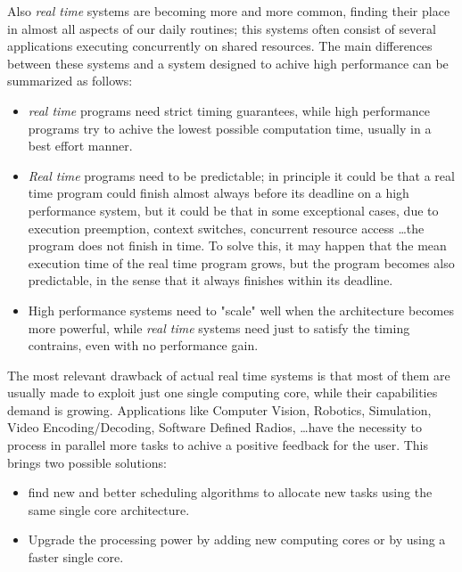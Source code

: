 \documentclass[a4paper,11pt,oneside]{book}
\begin{document}
Also \emph{real time} systems are becoming more and more common, finding their place in almost all aspects of our daily routines; this systems often consist of several applications executing concurrently on shared resources. 
The main differences between these systems and a system designed to achive high performance can be summarized as follows:
\begin{itemize}
\item{ \emph{real time} programs need strict timing guarantees, while high performance programs try to achive the lowest possible computation time, usually in a best effort manner.}
\item{\emph{Real time} programs need to be predictable; in principle it could be that a real time program could finish almost always before its deadline on a high performance system, but it could be that in some exceptional cases, due to execution preemption, context switches, concurrent resource access \dots the program does not finish in time. To solve this, it may happen that the mean execution time of the real time program grows, but the program becomes also predictable, in the sense that it always finishes within its deadline.}
\item{ High performance systems need to "scale" well when the architecture becomes more powerful, while \emph{real time} systems need just to satisfy the timing contrains, even with no performance gain.}

\end{itemize}

The most relevant drawback of actual real time systems is that most of them are usually made to exploit just one single computing core, while their capabilities demand is growing. Applications like Computer Vision, Robotics, Simulation, Video Encoding/Decoding, Software Defined Radios, \dots have the necessity to process in parallel more tasks to achive a positive feedback for the user. This brings two possible solutions:
\begin{itemize}
\item{find new and better scheduling algorithms to allocate new tasks using the same single core architecture.}
\item{Upgrade the processing power by adding new computing cores or by using a faster single core.}
\end{itemize}
\end{document}
